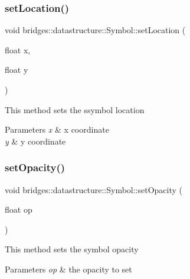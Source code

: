 \subsubsection{\texorpdfstring{set\+Location()}{setLocation()}\hspace{0.1cm}{\footnotesize\ttfamily [2/2]}}
{\footnotesize\ttfamily void bridges\+::datastructure\+::\+Symbol\+::set\+Location (\begin{DoxyParamCaption}\item[{float}]{x,  }\item[{float}]{y }\end{DoxyParamCaption})\hspace{0.3cm}{\ttfamily [inline]}}

This method sets the ssymbol location


\begin{DoxyParams}{Parameters}
{\em x} & x coordinate \\
\hline
{\em y} & y coordinate \\
\hline
\end{DoxyParams}
\mbox{\label{classbridges_1_1datastructure_1_1_symbol_a889bace56d39df0ac09ba408ca868b7d}} 
\subsubsection{\texorpdfstring{set\+Opacity()}{setOpacity()}}
{\footnotesize\ttfamily void bridges\+::datastructure\+::\+Symbol\+::set\+Opacity (\begin{DoxyParamCaption}\item[{float}]{op }\end{DoxyParamCaption})\hspace{0.3cm}{\ttfamily [inline]}}

This method sets the symbol opacity


\begin{DoxyParams}{Parameters}
{\em op} & the opacity to set \\
\hline
\end{DoxyParams}
\mbox{\label{classbridges_1_1datastructure_1_1_symbol_add56ff3bb5b276c016cfe377ff0f3fe2}} 
